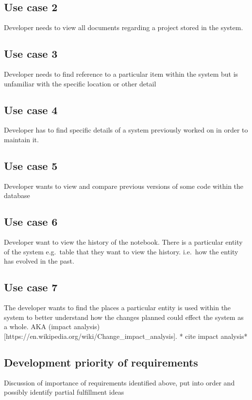 \subsection{Use case 2}\label{use-case-2}

Developer needs to view all documents regarding a project stored in the
system.

\subsection{Use case 3}\label{use-case-3}

Developer needs to find reference to a particular item within the system
but is unfamiliar with the specific location or other detail

\subsection{Use case 4}\label{use-case-4}

Developer has to find specific details of a system previously worked on
in order to maintain it.

\subsection{Use case 5}\label{use-case-5}

Developer wants to view and compare previous versions of some code
within the database

\subsection{Use case 6}\label{use-case-6}

Developer want to view the history of the notebook. There is a
particular entity of the system e.g.~table that they want to view the
history. i.e.~how the entity has evolved in the past.

\subsection{Use case 7}\label{use-case-7}

The developer wants to find the places a particular entity is used
within the system to better understand how the changes planned could
effect the system as a whole. AKA (impact
analysis){[}https://en.wikipedia.org/wiki/Change\_impact\_analysis{]}. *
cite impact analysis*

\subsection{ Development priority of requirements}

Discussion of importance of requirements identified above, put into
order and possibly identify partial fulfillment ideas
